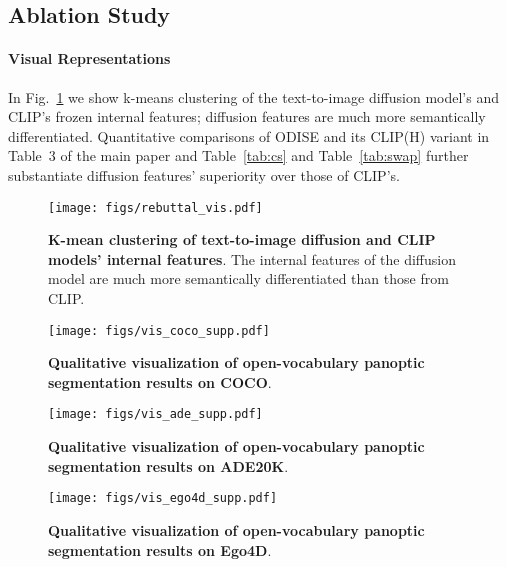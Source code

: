 \documentclass[10pt,twocolumn,letterpaper]{article}
\newcommand{\ourmethod}{ODISE}
\begin{document}
\subsection{Ablation Study}

\paragraph{Visual Representations}
In Fig.~\ref{fig:cluster_compare} we show k-means clustering of the text-to-image diffusion model's and CLIP's frozen internal features; diffusion features are much more semantically differentiated. Quantitative comparisons of \ourmethod{} and its CLIP(H) variant in Table~3 of the main paper and Table~\ref{tab:cs}  and Table~\ref{tab:swap} further substantiate diffusion features' superiority over those of CLIP's. 

\begin{figure}[!h]
   \centering
   \texttt{[image: figs/rebuttal\_vis.pdf]}
   \vspace{-.5em}
   \caption{
      \label{fig:cluster_compare}
      \textbf{K-mean clustering of text-to-image diffusion and CLIP models' internal features}. The internal features of the diffusion model are much more semantically differentiated than those from CLIP.
   }
\end{figure}


\begin{figure*}[t]
    \centering
    \texttt{[image: figs/vis\_coco\_supp.pdf]}
    \caption{
        \textbf{Qualitative visualization of open-vocabulary panoptic segmentation results on COCO}. 
    }
    \vspace{-1.2em}
    \label{fig:vis_coco_supp}
\end{figure*}

\begin{figure*}[t]
    \centering
\texttt{[image: figs/vis\_ade\_supp.pdf]}
\caption{
        \textbf{Qualitative visualization of open-vocabulary panoptic segmentation results on ADE20K}. 
    }
    \vspace{-1.2em}
    \label{fig:vis_ade_supp}
\end{figure*}

\begin{figure*}[t]
    \centering
\texttt{[image: figs/vis\_ego4d\_supp.pdf]}
\caption{
        \textbf{Qualitative visualization of open-vocabulary panoptic segmentation results on Ego4D}. 
    }
    \vspace{-1.2em}
    \label{fig:vis_ego4d_supp}
\end{figure*}
\end{document}
